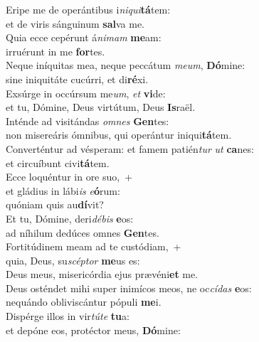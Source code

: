 \evenverse Eripe me de operántibus i\textit{ni}\textit{qui}\textbf{tá}tem:~\*\\
\evenverse et de viris sánguinum \textbf{sal}va me.\\
\oddverse Quia ecce cepérunt á\textit{ni}\textit{mam} \textbf{me}am:~\*\\
\oddverse irruérunt in me \textbf{for}tes.\\
\evenverse Neque iníquitas mea, neque peccátum \textit{me}\textit{um}, \textbf{Dó}mine:~\*\\
\evenverse sine iniquitáte cucúrri, et di\textbf{ré}xi.\\
\oddverse Exsúrge in occúrsum me\textit{um}, \textit{et} \textbf{vi}de:~\*\\
\oddverse et tu, Dómine, Deus virtútum, Deus \textbf{Is}raël.\\
\evenverse Inténde ad visitándas \textit{om}\textit{nes} \textbf{Gen}tes:~\*\\
\evenverse non misereáris ómnibus, qui operántur iniqui\textbf{tá}tem.\\
\oddverse Converténtur ad vésperam: et famem patién\textit{tur} \textit{ut} \textbf{ca}nes:~\*\\
\oddverse et circuíbunt civi\textbf{tá}tem.\\
\evenverse Ecce loquéntur in ore suo,~+\\
\evenverse  et gládius in lábi\textit{is} \textit{e}\textbf{ó}rum:~\*\\
\evenverse quóniam quis au\textbf{dí}vit?\\
\oddverse Et tu, Dómine, deri\textit{dé}\textit{bis} \textbf{e}os:~\*\\
\oddverse ad níhilum dedúces omnes \textbf{Gen}tes.\\
\evenverse Fortitúdinem meam ad te custódiam,~+\\
\evenverse  quia, Deus, su\textit{scép}\textit{tor} \textbf{me}us es:~\*\\
\evenverse Deus meus, misericórdia ejus prævéni\textbf{et} me.\\
\oddverse Deus osténdet mihi super inimícos meos, ne oc\textit{cí}\textit{das} \textbf{e}os:~\*\\
\oddverse nequándo obliviscántur pópuli \textbf{me}i.\\
\evenverse Dispérge illos in vir\textit{tú}\textit{te} \textbf{tu}a:~\*\\
\evenverse et depóne eos, protéctor meus, \textbf{Dó}mine:\\
